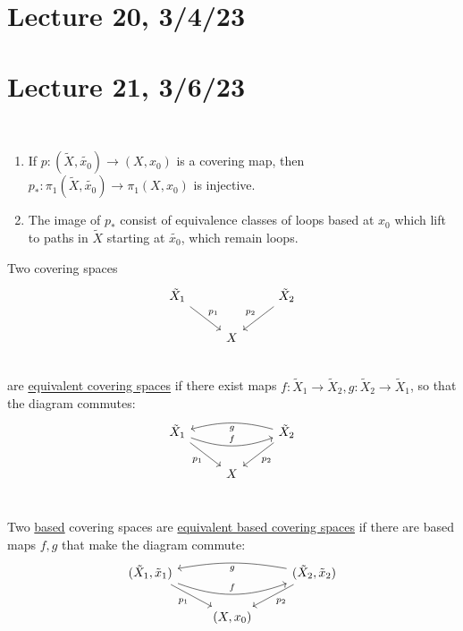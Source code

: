 \documentclass[x11names,reqno,14pt]{extarticle}
\begin{document}
\section*{Lecture 20, 3/4/23}

\section*{Lecture 21, 3/6/23}

\prop\,


\begin{enumerate}[label=(\alph*)]

\item If $p:(\tilde{X},\tilde{x_0})\to(X, x_0)$ is a covering map, then $p_*:\pi_1(\tilde{X},\tilde{x_0}) \to \pi_1(X, x_0)$ is injective.

\item The image of $p_*$ consist of equivalence classes of loops based at $x_0$ which lift to paths in $\tilde{X}$ starting at $\tilde{x_0}$, which remain loops.  

\end{enumerate}


Two covering spaces 
\[
\begin{tikzcd}
\tilde{X}_1\ar[dr, "p_1"] & & \tilde{X}_2\ar[dl, "p_2"'] \\
& X & \\
\end{tikzcd}
\]
are \underline{equivalent covering spaces} if there exist maps $f:\tilde{X}_1\to\tilde{X}_2, g:\tilde{X}_2\to\tilde{X}_1$, so that the diagram commutes:
\[
\begin{tikzcd}
\tilde{X}_1\ar[dr, "p_1"']\ar[rr, bend right = 20, "f"] & & \tilde{X}_2\ar[dl, "p_2"] \ar[ll, bend right = 15, "g"'']\\
& X & \\
\end{tikzcd}
\]


Two \underline{based} covering spaces are \underline{equivalent based covering spaces} if there are based maps $f, g$ that make the diagram commute:
\[
\begin{tikzcd}
(\tilde{X}_1,\tilde{x}_1)\ar[dr, "p_1"']\ar[rr, bend right = 20, "f"] & & (\tilde{X}_2,\tilde{x}_2)\ar[dl, "p_2"] \ar[ll, bend right = 10, "g"'']\\
& (X, x_0) & \\
\end{tikzcd}
\]
\end{document}
